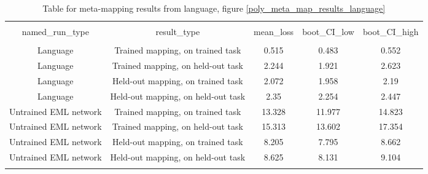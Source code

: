 \begin{table}[H]
\scriptsize
\centering
\begin{tabular}{@{\extracolsep{5pt}} ccccc} 
\\[-1.8ex]\hline 
\hline \\[-1.8ex] 
named\_run\_type & result\_type & mean\_loss & boot\_CI\_low & boot\_CI\_high \\ 
\hline \\[-1.8ex] 
Language & Trained mapping, on trained task & 0.515 & 0.483 & 0.552 \\ 
Language & Trained mapping, on held-out task & 2.244 & 1.921 & 2.623 \\ 
Language & Held-out mapping, on trained task & 2.072 & 1.958 & 2.19 \\ 
Language & Held-out mapping, on held-out task & 2.35 & 2.254 & 2.447 \\ 
Untrained EML network & Trained mapping, on trained task & 13.328 & 11.977 & 14.823 \\ 
Untrained EML network & Trained mapping, on held-out task & 15.313 & 13.602 & 17.354 \\ 
Untrained EML network & Held-out mapping, on trained task & 8.205 & 7.795 & 8.662 \\ 
Untrained EML network & Held-out mapping, on held-out task & 8.625 & 8.131 & 9.104 \\ 
\hline \\[-1.8ex] 
\end{tabular}
\caption{Table for meta-mapping results from language, figure \ref{poly_meta_map_results_language}}
\end{table}

